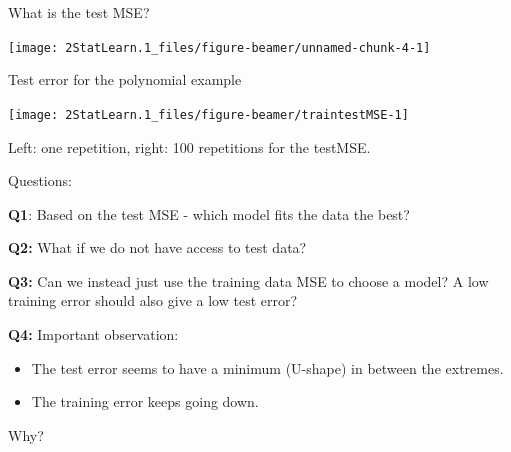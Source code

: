 \documentclass[
  ignorenonframetext,
]{beamer}
\begin{document}
\begin{frame}
\begin{block}{What is the test MSE?}
\protect\hypertarget{what-is-the-test-mse}{}
\begin{center}\texttt{[image: 2StatLearn.1\_files/figure-beamer/unnamed-chunk-4-1]} \end{center}
\end{block}
\end{frame}

\begin{frame}
\begin{block}{Test error for the polynomial example}
\protect\hypertarget{test-error-for-the-polynomial-example}{}
\(~\)

\begin{center}\texttt{[image: 2StatLearn.1\_files/figure-beamer/traintestMSE-1]} \end{center}

Left: one repetition, right: 100 repetitions for the testMSE.
\end{block}
\end{frame}

\begin{frame}
\begin{block}{Questions:}
\protect\hypertarget{questions}{}
\(~\)

\textbf{Q1}: Based on the test MSE - which model fits the data the best?

\vspace{2mm}

\textbf{Q2:} What if we do not have access to test data?

\vspace{2mm}

\textbf{Q3:} Can we instead just use the training data MSE to choose a
model? A low training error should also give a low test error?

\vspace{2mm}

\textbf{Q4:} Important observation:

\vspace{2mm}

\begin{itemize}
\item
  The test error seems to have a minimum (U-shape) in between the
  extremes.
\item
  The training error keeps going down.
\end{itemize}

\centering
\vspace{2mm}

Why?
\end{block}
\end{frame}
\end{document}
